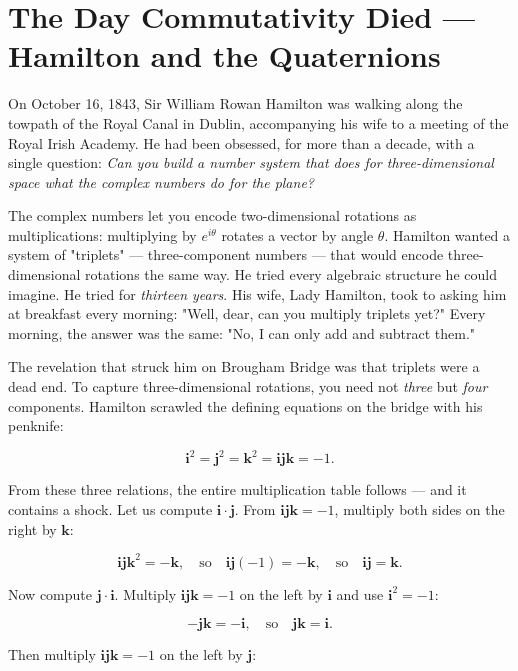 \bigskip

\section*{The Day Commutativity Died --- Hamilton and the Quaternions}

On October 16, 1843, Sir William Rowan Hamilton was walking along the towpath of the Royal Canal in Dublin, accompanying his wife to a meeting of the Royal Irish Academy. He had been obsessed, for more than a decade, with a single question: \textit{Can you build a number system that does for three-dimensional space what the complex numbers do for the plane?}

The complex numbers let you encode two-dimensional rotations as multiplications: multiplying by $e^{i\theta}$ rotates a vector by angle $\theta$. Hamilton wanted a system of "triplets" --- three-component numbers --- that would encode three-dimensional rotations the same way. He tried every algebraic structure he could imagine. He tried for \textit{thirteen years}. His wife, Lady Hamilton, took to asking him at breakfast every morning: "Well, dear, can you multiply triplets yet?" Every morning, the answer was the same: "No, I can only add and subtract them."

The revelation that struck him on Brougham Bridge was that triplets were a dead end. To capture three-dimensional rotations, you need not \textit{three} but \textit{four} components. Hamilton scrawled the defining equations on the bridge with his penknife:

\[
\mathbf{i}^2 = \mathbf{j}^2 = \mathbf{k}^2 = \mathbf{i}\mathbf{j}\mathbf{k} = -1.
\]

From these three relations, the entire multiplication table follows --- and it contains a shock. Let us compute $\mathbf{i} \cdot \mathbf{j}$. From $\mathbf{i}\mathbf{j}\mathbf{k} = -1$, multiply both sides on the right by $\mathbf{k}$:

\[
\mathbf{i}\mathbf{j}\mathbf{k}^2 = -\mathbf{k}, \quad \text{so} \quad \mathbf{i}\mathbf{j}(-1) = -\mathbf{k}, \quad \text{so} \quad \mathbf{i}\mathbf{j} = \mathbf{k}.
\]

Now compute $\mathbf{j} \cdot \mathbf{i}$. Multiply $\mathbf{i}\mathbf{j}\mathbf{k} = -1$ on the left by $\mathbf{i}$ and use $\mathbf{i}^2 = -1$:

\[
-\mathbf{j}\mathbf{k} = -\mathbf{i}, \quad \text{so} \quad \mathbf{j}\mathbf{k} = \mathbf{i}.
\]

Then multiply $\mathbf{i}\mathbf{j}\mathbf{k} = -1$ on the left by $\mathbf{j}$:

